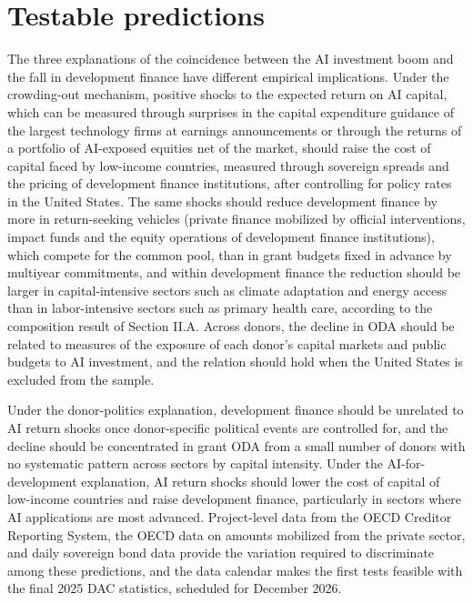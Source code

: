 \documentclass[AER]{AEA}
\begin{document}
\section{Testable predictions}

The three explanations of the coincidence between the AI investment boom and the fall in development finance have different empirical implications. Under the crowding-out mechanism, positive shocks to the expected return on AI capital, which can be measured through surprises in the capital expenditure guidance of the largest technology firms at earnings announcements or through the returns of a portfolio of AI-exposed equities net of the market, should raise the cost of capital faced by low-income countries, measured through sovereign spreads and the pricing of development finance institutions, after controlling for policy rates in the United States. The same shocks should reduce development finance by more in return-seeking vehicles (private finance mobilized by official interventions, impact funds and the equity operations of development finance institutions), which compete for the common pool, than in grant budgets fixed in advance by multiyear commitments, and within development finance the reduction should be larger in capital-intensive sectors such as climate adaptation and energy access than in labor-intensive sectors such as primary health care, according to the composition result of Section II.A. Across donors, the decline in ODA should be related to measures of the exposure of each donor's capital markets and public budgets to AI investment, and the relation should hold when the United States is excluded from the sample.

Under the donor-politics explanation, development finance should be unrelated to AI return shocks once donor-specific political events are controlled for, and the decline should be concentrated in grant ODA from a small number of donors with no systematic pattern across sectors by capital intensity. Under the AI-for-development explanation, AI return shocks should lower the cost of capital of low-income countries and raise development finance, particularly in sectors where AI applications are most advanced. Project-level data from the OECD Creditor Reporting System, the OECD data on amounts mobilized from the private sector, and daily sovereign bond data provide the variation required to discriminate among these predictions, and the data calendar makes the first tests feasible with the final 2025 DAC statistics, scheduled for December 2026.
\end{document}
